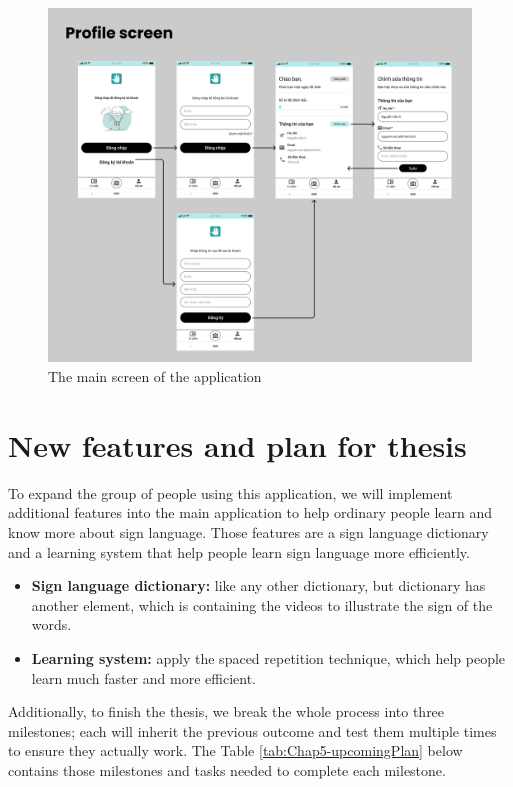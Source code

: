 \begin{figure}[H]
	\centering
	\includegraphics[width=\textwidth]{img/Chap5/Profile_screen.png}
	\caption{The main screen of the application}
\end{figure}

\section{New features and plan for thesis}

To expand the group of people using this application, we will implement additional features into the main application to help ordinary people learn and know more about sign language. Those features are a sign language dictionary and a learning system that help people learn sign language more efficiently.

\begin{itemize}
	\item \textbf{Sign language dictionary:} like any other dictionary, but dictionary has another element, which is containing the videos to illustrate the sign of the words.
	\item \textbf{Learning system:} apply the spaced repetition technique, which help people learn much faster and more efficient.
\end{itemize}

Additionally, to finish the thesis, we break the whole process into three milestones; each will inherit the previous outcome and test them multiple times to ensure they actually work. The Table \ref{tab:Chap5-upcomingPlan} below contains those milestones and tasks needed to complete each milestone.

